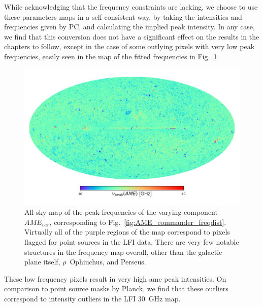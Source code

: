             While acknowledging that the frequency constraints are lacking, we choose  to use these parameters maps in a self-consistent way, by taking the intensities and frequencies given by PC, and calculating the implied peak intensity. In any case, we find that this conversion does not have a significant effect on the results in the chapters to follow, except in the case of some outlying pixels with very low peak frequencies, easily seen in the map of the fitted frequencies in Fig.~\ref{fig:PCAME_var_freq}.
               \begin{figure}
                 \includegraphics[width=\textwidth]{../Plots/ch_datasources/PCAME_var_freq.pdf}
                 \centering
                 \caption{All-sky map of the peak frequencies of the varying component $AME_{var}$, corresponding to Fig.~\ref{fig:AME_commander_freqdist}. Virtually all of the purple regions of the map correspond to pixels flagged for point sources in the LFI data. There are very few notable structures in the frequency map overall, other than the galactic plane itself, $\rho$~Ophiuchus, and Perseus.}
                 \label{fig:PCAME_var_freq}
               \end{figure}
               These low frequency pixels result in very high \acrshort{ame} peak intensities. On comparison to point source masks by Planck, we find that these outliers correspond to intensity outliers in the LFI 30~GHz map.

